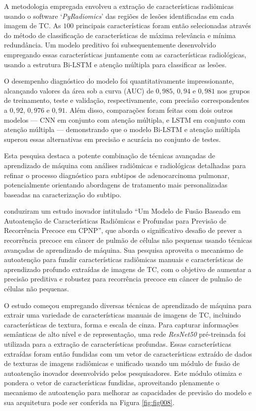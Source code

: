 A metodologia empregada envolveu a extração de características radiômicas usando o software `\textit{PyRadiomics}' das regiões de lesões identificadas em cada imagem de \gls{TC}. As $100$ principais características foram então selecionadas através do método de classificação de características de máxima relevância e mínima redundância. Um modelo preditivo foi subsequentemente desenvolvido empregando essas características juntamente com as características radiológicas, usando a estrutura Bi-LSTM e atenção múltipla para classificar as lesões.

O desempenho diagnóstico do modelo foi quantitativamente impressionante, alcançando valores da área sob a curva (AUC) de $0,985$, $0,94$ e $0,981$ nos grupos de treinamento, teste e validação, respectivamente, com precisão correspondentes a $0,92$, $0,976$ e $0,91$. Além disso, comparações foram feitas com dois outros modelos — \gls{CNN} em conjunto com atenção múltipla, e LSTM em conjunto com atenção múltipla — demonstrando que o modelo Bi-LSTM e atenção múltipla superou essas alternativas em precisão e acurácia no conjunto de testes.

Esta pesquisa destaca a potente combinação de técnicas avançadas de aprendizado de máquina com análises radiômicas e radiológicas detalhadas para refinar o processo diagnóstico para subtipos de adenocarcinoma pulmonar, potencialmente orientando abordagens de tratamento mais personalizadas baseadas na caracterização do subtipo.

  conduziram um estudo inovador intitulado ``Um Modelo de Fusão Baseado em Autoatenção de Características Radiômicas e Profundas para Previsão de Recorrência Precoce em CPNP'', que aborda o significativo desafio de prever a recorrência precoce em câncer de pulmão de células não pequenas usando técnicas avançadas de aprendizado de máquina. Sua pesquisa aproveita o mecanismo de autoatenção para fundir características radiômicas manuais e características de aprendizado profundo extraídas de imagens de \gls{TC}, com o objetivo de aumentar a precisão preditiva e robustez para recorrência precoce em câncer de pulmão de células não pequenas.

O estudo começou empregando diversas técnicas de aprendizado de máquina para extrair uma variedade de características manuais de imagens de \gls{TC}, incluindo características de textura, forma e escala de cinza. Para capturar informações semânticas de alto nível e de representação, uma rede \textit{ResNet50} pré-treinada foi utilizada para a extração de características profundas. Essas características extraídas foram então fundidas com um vetor de características extraído de dados de texturas de imagens radiômicas e unificado usando um módulo de fusão de autoatenção inovador desenvolvido pelos pesquisadores. Este módulo otimiza e pondera o vetor de características fundidas, aproveitando plenamente o mecanismo de autoatenção para melhorar as capacidades de previsão do modelo e sua arquitetura pode ser conferida na Figura \ref{fig:fig008}.

